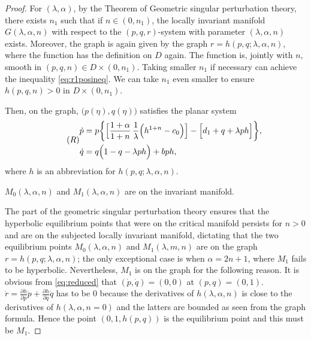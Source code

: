 \documentclass[a4paper,11pt]{article}
\def\dpp{\dot{p}}
\def\dqq{\dot{q}}
\begin{document}
\smallskip
\noindent
\begin{proof}
{}
\medskip
For $(\lambda,\alpha)$, by the Theorem of Geometric singular perturbation theory, there exists $n_1$ such that if $n\in(0,n_1)$, the locally invariant manifold $G(\lambda,\alpha,n)$ with respect to the $(p,q,r)$-system with parameter $(\lambda,\alpha,n)$ exists. Moreover, the graph is again given by the graph $r=h(p,q;\lambda,\alpha,n)$, where the function has the definition on $D$ again. The function is, jointly with $n$, smooth in $(p,q,n) \in D\times(0,n_1)$. Taking smaller $n_1$ if necessary can achieve the inequality \eqref{eq:r1posineq}. We can take $n_1$ even smaller to ensure $h(p,q,n)>0$ in $D\times(0,n_1)$.


Then, on the graph, $\big(p(\eta),q(\eta)\big)$ satisfies the planar system
\begin{equation} \tag*{(${R}$)} \label{eq:reduced}
\begin{aligned}
 {\dpp}&=p\bigg\{\Big[\frac{1+\alpha}{1+n}\,\frac{1}{\lambda }\Big(h^{1+n}-c_0\Big)\Big] -\Big[d_1 + q + \lambda ph\Big]\bigg\},\\
 {\dqq}&=q\Big(1-q-\lambda p h\Big) + bph,\\
\end{aligned}
\end{equation}
where $h$ is an abbreviation for $h(p,q;\lambda,\alpha,n)$.

\medskip
{}
$M_0(\lambda,\alpha,n)$ and $M_1(\lambda,\alpha,n)$ are on the invariant manifold.
\medskip

The part of the geometric singular perturbation theory ensures that the hyperbolic equilibrium points that were on the critical manifold persists for $n>0$ and are on the subjected locally invariant manifold, dictating that the two equilibrium points $M_0(\lambda,\alpha,n)$ and $M_1(\lambda,m,n)$ are on the graph $r=h(p,q;\lambda,\alpha,n)$; the only exceptional case is when $\alpha=2n+1$, where $M_1$ fails to be hyperbolic. Nevertheless, $M_1$ is on the graph for the following reason. It is obvious from \eqref{eq:reduced} that $(\dot{p},\dot{q})=(0,0)$ at $(p,q)=(0,1)$. $\dot{r} = \frac{\partial h}{\partial p} \dot{p} + \frac{\partial h}{\partial q} \dot{q}$ has to be $0$ because the derivatives of $h(\lambda,\alpha,n)$ is close to the derivatives of $h(\lambda,\alpha,n=0)$ and the latters are bounded as seen from the graph formula. Hence the point $(0,1,h(p,q))$ is the equilibrium point and this must be $M_1$.


\end{proof}
\end{document}
